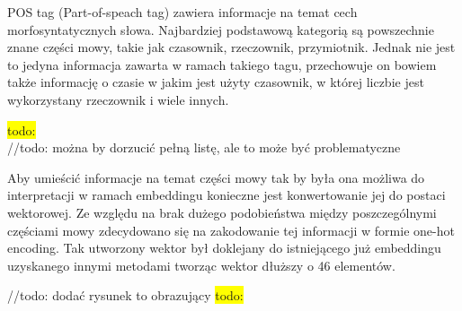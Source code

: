 POS tag (Part-of-speach tag) zawiera informacje na temat cech morfosyntatycznych słowa. Najbardziej podstawową kategorią są powszechnie znane części mowy, takie jak czasownik, rzeczownik, przymiotnik. Jednak nie jest to jedyna informacja zawarta w ramach takiego tagu, przechowuje on bowiem także informację o czasie w jakim jest użyty czasownik, w której liczbie jest wykorzystany rzeczownik i wiele innych.  

\colorbox{yellow}{todo:}\\
//todo: można by dorzucić pełną listę, ale to może być problematyczne 
 

Aby umieścić informacje na temat części mowy tak by była ona możliwa do interpretacji w ramach embeddingu konieczne jest konwertowanie jej do postaci wektorowej. Ze względu na brak dużego podobieństwa między poszczególnymi częściami mowy zdecydowano się na zakodowanie tej informacji w formie one-hot encoding. Tak utworzony wektor był doklejany do istniejącego już embeddingu uzyskanego innymi metodami tworząc wektor dłuższy o 46 elementów. 

//todo: dodać rysunek to obrazujący
\colorbox{yellow}{todo:}\\
